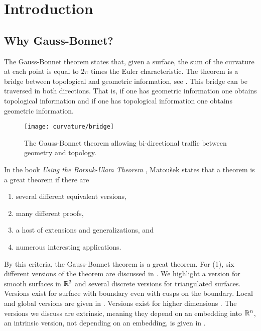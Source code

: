 \section{Introduction}
\label{sec:intro}

\subsection{Why Gauss-Bonnet?}
The Gauss-Bonnet theorem states that, given a surface, the sum of the curvature
at each point is equal to $2\pi$ times the Euler characteristic.
The theorem is a bridge between topological
and geometric information, see . 
This bridge can be traversed in both directions.
That is, if one has geometric information one obtains topological information and
if one has topological information one obtains geometric information.


\begin{figure}[htb]
\centering
\texttt{[image: curvature/bridge]}
\caption{The Gauss-Bonnet theorem allowing bi-directional traffic
between geometry and topology.}
\label{fig:bridge}
\end{figure}

In the book \emph{Using the Borsuk-Ulam Theorem}
\cite{jm08},
Matou\v{s}ek states that a theorem is a great theorem if there are
\begin{enumerate}[(1)]
\item several different equivalent versions,
\item many different proofs,
\item a host of extensions and generalizations, and
\item numerous interesting applications.
\end{enumerate}

By this criteria, the Gauss-Bonnet theorem is a great theorem.
For (1), six different versions of the theorem are discussed
in \cite{wu_historical_2008}. 
We highlight a version for smooth surfaces in $\mathbb{R}^3$ and
 several discrete versions for triangulated surfaces. 
 Versions exist for surface with boundary even with cusps on
 the boundary.
 Local and global versions are given in \cite{doc76}.
Versions exist for higher dimensions \cite{guillemin_differential_2010}.
The versions we discuss are extrinsic, meaning they depend on an embedding
into $\mathbb{R}^n$, an intrinsic version, not depending on an embedding,
 is given in \cite{chern_simple_1944}.
 
